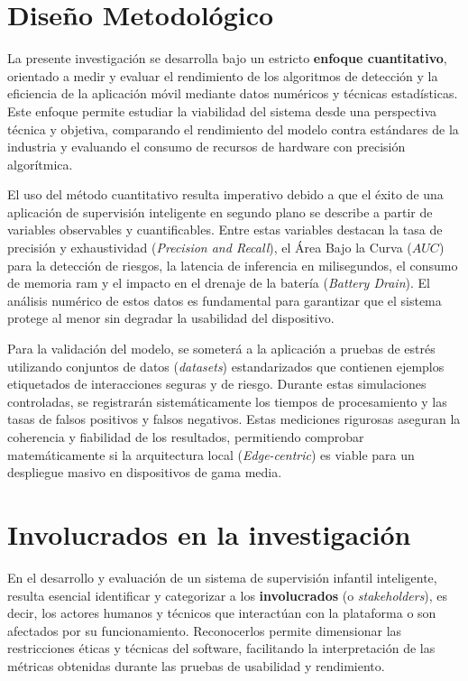 \section{Diseño Metodológico}

La presente investigación se desarrolla bajo un estricto \textbf{enfoque cuantitativo}, orientado a medir y evaluar el rendimiento de los algoritmos de detección y la eficiencia de la aplicación móvil mediante datos numéricos y técnicas estadísticas. Este enfoque permite estudiar la viabilidad del sistema desde una perspectiva técnica y objetiva, comparando el rendimiento del modelo contra estándares de la industria y evaluando el consumo de recursos de hardware con precisión algorítmica.

El uso del método cuantitativo resulta imperativo debido a que el éxito de una aplicación de supervisión inteligente en segundo plano se describe a partir de variables observables y cuantificables. Entre estas variables destacan la tasa de precisión y exhaustividad (\textit{Precision and Recall}), el Área Bajo la Curva ($AUC$) para la detección de riesgos, la latencia de inferencia en milisegundos, el consumo de memoria \gls{ram} y el impacto en el drenaje de la batería (\textit{Battery Drain}). El análisis numérico de estos datos es fundamental para garantizar que el sistema protege al menor sin degradar la usabilidad del dispositivo.

Para la validación del modelo, se someterá a la aplicación a pruebas de estrés utilizando conjuntos de datos (\textit{datasets}) estandarizados que contienen ejemplos etiquetados de interacciones seguras y de riesgo. Durante estas simulaciones controladas, se registrarán sistemáticamente los tiempos de procesamiento y las tasas de falsos positivos y falsos negativos. Estas mediciones rigurosas aseguran la coherencia y fiabilidad de los resultados, permitiendo comprobar matemáticamente si la arquitectura local (\textit{Edge-centric}) es viable para un despliegue masivo en dispositivos de gama media.

\section{Involucrados en la investigación}

En el desarrollo y evaluación de un sistema de supervisión infantil inteligente, resulta esencial identificar y categorizar a los \textbf{involucrados} (o \textit{stakeholders}), es decir, los actores humanos y técnicos que interactúan con la plataforma o son afectados por su funcionamiento. Reconocerlos permite dimensionar las restricciones éticas y técnicas del software, facilitando la interpretación de las métricas obtenidas durante las pruebas de usabilidad y rendimiento.

